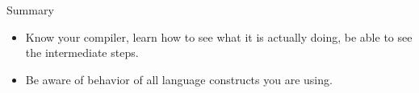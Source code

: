 \begin{frame}{Summary}
    \begin{itemize}
        \item Know your compiler, learn how to see what it is actually doing, be able to see the intermediate steps.
        \item Be aware of behavior of all language constructs you are using.
    \end{itemize}
\end{frame}


